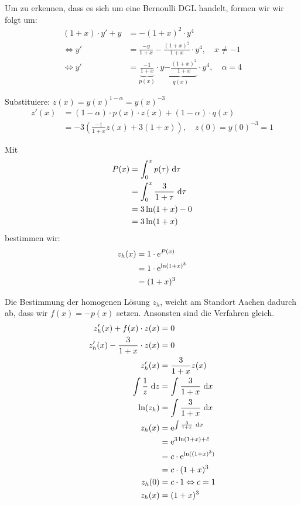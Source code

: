 \documentclass[main.tex]{subfiles}
\begin{document}
Um zu erkennen, dass es sich um eine Bernoulli DGL handelt, formen wir wir folgt um: 
\begin{align*}
	(1+x)\cdot y' + y &= - (1+x)^2\cdot y^4 \\
\Leftrightarrow	y' &= \frac{-y}{1+x} - \frac{(1+x)^2}{1+x} \cdot y^4, \quad x\neq -1 \\
\Leftrightarrow	y' &= \underbrace{\frac{-1}{1+x}}_{p(x)} \cdot y \underbrace{- \frac{(1+x)^2}{1+x}}_{q(x)} \cdot y^4, \quad \alpha = 4
\end{align*}

Substituiere: $z(x) = y(x)^{1-\alpha} = y(x)^{-3}$
\begin{align*}
	z'(x) &= (1-\alpha)\cdot p(x) \cdot z(x) + (1-\alpha)\cdot q(x)\\
		  &= -3(\frac{-1}{1+x} z(x) +3 (1+x)), \quad z(0)=y(0)^{-3}=1
\end{align*}

Mit
\begin{align*}
	P(x) &= \int^x_0 p(\tau) ~\mathrm{d}\tau\\
	&= \int^x_0 \frac{3}{1+\tau}~\mathrm{d}\tau\\
	&= 3\ln(1+x) - 0 \\
	&= 3\ln(1+x)
\end{align*}
bestimmen wir:
\begin{align*}
	z_h(x) &= 1\cdot e^{P(x)} \\
		   &= 1\cdot \mathrm{e}^{\ln(1+x)^3} \\
		   &= (1+x)^3
\end{align*}

Die Bestimmung der homogenen Lösung $z_h$, weicht am Standort Aachen dadurch ab, dass wir $f(x) = -p(x)$ setzen. Ansonsten sind die Verfahren gleich. 
\begin{align*}
	z_h'(x) + f(x)\cdot z(x) &= 0 \\
	z_h'(x) - \frac{3}{1+x}\cdot z(x) &= 0 \\
	z_h'(x) &= \frac{3}{1+x} z(x) \\
	\int \frac{1}{z}~\mathrm{d}z &= \int \frac{3}{1+x} ~\mathrm{d}x \\
	\ln(z_h) &= \int \frac{3}{1+x} ~\mathrm{d}x\\
	z_h(x) &= \mathrm{e}^{\int \frac{3}{1+x}~\mathrm{d}x} \\
	  &= \mathrm{e}^{3\ln(1+x)+\tilde{c}}\\
	  &= c\cdot \mathrm{e}^{\ln((1+x)^3)}\\
	  &= c\cdot (1+x)^3 \\
	z_h(0) &= c\cdot 1 \Leftrightarrow c = 1 \\
	z_h(x) &= (1+x)^3
\end{align*}
\end{document}
